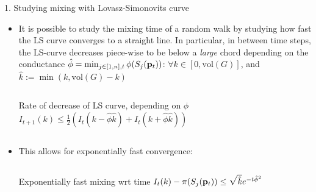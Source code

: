 \documentclass[../main.tex]{subfiles}
\begin{document}
    \begin{frame}{1. Studying mixing with Lovasz-Simonovits curve}
        \begin{itemize}
            \item It is possible to study the mixing time of a random walk by studying how fast the LS curve converges to a straight line. In particular, in between time steps, the LS-curve decreases piece-wise to be below a \textit{large} chord depending on the conductance $\hat{\phi} = \min_{j\in[1,n], t}\phi(S_j(\bold{p}_t))$: $\forall k\in[0,\text{vol}(G)]$, and $\hat{k}:=\min(k, \text{vol}(G)-k)$
                \begin{columns}
                    \begin{block}{Rate of decrease of LS curve, depending on $\hat{\phi}$}
                        $I_{t+1}(k) \leq \frac{1}{2}(I_t(k-\hat{\phi} \hat{k}) + I_t(k+\hat{\phi} \hat{k}))$
                    \end{block}
                \end{columns}
           \item This allows for exponentially fast convergence:
                \begin{columns}
                    \begin{block}{Exponentially fast mixing wrt time}
                        $I_{t}(k) - \pi(S_j(\bold{p}_t)) \leq \sqrt{\hat{k}}e^{-t \hat{\phi}^2}$
                    \end{block}
                \end{columns}
        \end{itemize}
    \end{frame}
    
\end{document}
